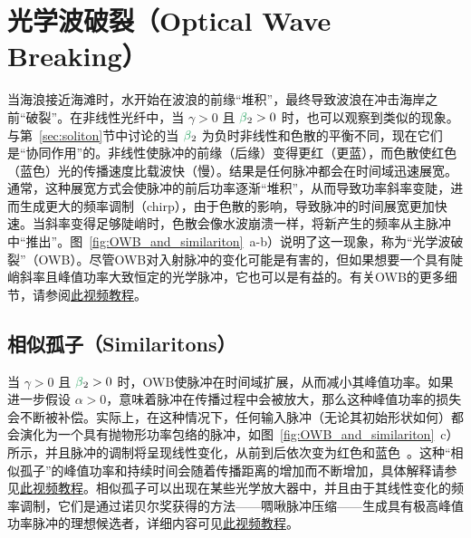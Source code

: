 \section{光学波破裂（Optical Wave Breaking）}
当海浪接近海滩时，水开始在波浪的前缘“堆积”，最终导致波浪在冲击海岸之前“破裂”。在非线性光纤中，当 $\gamma>0$ 且 $\betag_2>0$ 时，也可以观察到类似的现象。与第~\ref{sec:soliton}节中讨论的当 $\betag_2$ 为负时非线性和色散的平衡不同，现在它们是“协同作用”的。非线性使脉冲的前缘（后缘）变得更红（更蓝），而色散使红色（蓝色）光的传播速度比载波快（慢）。结果是任何脉冲都会在时间域迅速展宽。通常，这种展宽方式会使脉冲的前后功率逐渐“堆积”，从而导致功率斜率变陡，进而生成更大的频率调制（chirp），由于色散的影响，导致脉冲的时间展宽更加快速。当斜率变得足够陡峭时，色散会像水波崩溃一样，将新产生的频率从主脉冲中“推出”。图~\ref{fig:OWB_and_similariton}~a-b）说明了这一现象，称为“光学波破裂”（OWB）。尽管OWB对入射脉冲的变化可能是有害的，但如果想要一个具有陡峭斜率且峰值功率大致恒定的光学脉冲，它也可以是有益的。有关OWB的更多细节，请参阅\href{https://youtu.be/XEx6lOf6f40}{此视频教程}。

\subsection{相似孤子（Similaritons）}
当 $\gamma>0$ 且 $\betag_2>0$ 时，OWB使脉冲在时间域扩展，从而减小其峰值功率。如果进一步假设 $\alpha>0$，意味着脉冲在传播过程中会被放大，那么这种峰值功率的损失会不断被补偿。实际上，在这种情况下，任何输入脉冲（无论其初始形状如何）都会演化为一个具有抛物形功率包络的脉冲，如图~\ref{fig:OWB_and_similariton}~c）所示，并且脉冲的调制将呈现线性变化，从前到后依次变为红色和蓝色~\cite{Similariton_evolution}。这种“相似孤子”的峰值功率和持续时间会随着传播距离的增加而不断增加，具体解释请参见\href{https://youtu.be/ZtWIRaj5VV4}{此视频教程}。相似孤子可以出现在某些光学放大器中，并且由于其线性变化的频率调制，它们是通过诺贝尔奖获得的方法——啁啾脉冲压缩——生成具有极高峰值功率脉冲的理想候选者，详细内容可见\href{https://youtu.be/Eh5CHRWFT-M}{此视频教程}。

